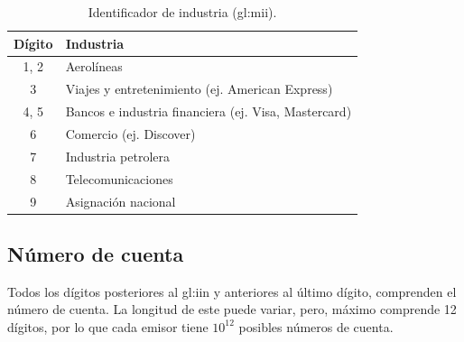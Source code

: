 \begin{table}[H]
  \centering
  \begin{tabular}{ c|l }
    Dígito & Industria \\ \hline
    1, 2 & Aerolíneas \\
    3 & Viajes y entretenimiento (ej. American Express) \\
    4, 5 &  Bancos e industria financiera (ej. Visa, Mastercard)\\
    6 & Comercio (ej. Discover) \\
    7 &  Industria petrolera \\
    8 &  Telecomunicaciones \\
    9 &  Asignación nacional \\
    \end{tabular}
    \caption{Identificador de industria (\gls{gl:mii}).}\label{tabla:mii}
\end{table}

\subsection{Número de cuenta}
Todos los dígitos posteriores al \gls{gl:iin} y anteriores al último dígito,
comprenden el número de cuenta. La longitud de este puede variar, pero, máximo
comprende 12 dígitos, por lo que cada emisor tiene $10^{12}$ posibles números
de cuenta.

